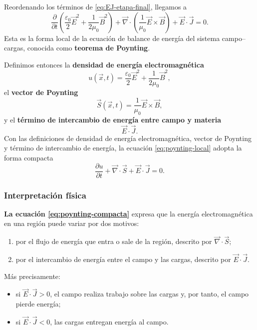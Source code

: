 \documentclass[12pt,a4paper]{article}
\theoremstyle{definition}
\theoremstyle{plain}
\numberwithin{equation}{section}
\theoremstyle{remark}
\newcommand{\E}{\vec{E}}
\newcommand{\B}{\vec{B}}
\newcommand{\J}{\vec{J}}
\begin{document}
Reordenando los términos de \eqref{eq:EJ-etapa-final}, llegamos a
\begin{equation}
    \frac{\partial}{\partial t}
    \left(
        \frac{\varepsilon_0}{2}\E^2+\frac{1}{2\mu_0}\B^2
    \right)
    +
    \vec\nabla\cdot\left(\frac{1}{\mu_0}\E\times\B\right)
    +
    \E\cdot\J
    =0.
    \label{eq:poynting-local}
\end{equation}
Esta es la forma local de la ecuación de balance de energía del sistema campo--cargas, conocida como \textbf{teorema de Poynting}.

Definimos entonces la \textbf{densidad de energía electromagnética}
\begin{equation*}
    u(\vec x,t)=\frac{\varepsilon_0}{2}\E^2+\frac{1}{2\mu_0}\B^2,
\end{equation*}
el \textbf{vector de Poynting}
\begin{equation*}
    \vec S(\vec x,t)=\frac{1}{\mu_0}\E\times\B,
\end{equation*}
y el \textbf{término de intercambio de energía entre campo y materia}
\begin{equation*}
    \E\cdot\J.
\end{equation*}
Con las definiciones de densidad de energía electromagnética, vector de Poynting y término de intercambio de energía, la ecuación \eqref{eq:poynting-local} adopta la forma compacta
\begin{equation}
    \frac{\partial u}{\partial t}+\vec\nabla\cdot\vec S+\E\cdot\J=0.
    \label{eq:poynting-compacta}
\end{equation}

\subsubsection*{Interpretación física}

\textbf{La ecuación \eqref{eq:poynting-compacta}} expresa que la energía electromagnética en una región puede variar por dos motivos:

\begin{enumerate}
    \item por el flujo de energía que entra o sale de la región, descrito por $\vec\nabla\cdot\vec S$;
    \item por el intercambio de energía entre el campo y las cargas, descrito por $\E\cdot\J$.
\end{enumerate}

Más precisamente:

\begin{itemize}
    \item si $\E\cdot\J>0$, el campo realiza trabajo sobre las cargas y, por tanto, el campo pierde energía;
    \item si $\E\cdot\J<0$, las cargas entregan energía al campo.
\end{itemize}
\end{document}

